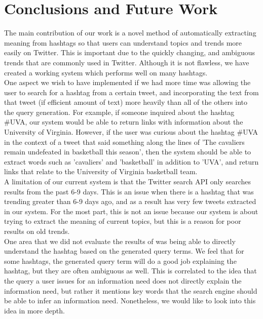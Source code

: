 \documentclass{sig-alternate}
\begin{document}
\section{Conclusions and Future Work}
\label{sec:conclusions}
The main contribution of our work is a novel method of automatically extracting meaning from hashtags so that users can understand topics and trends more easily on Twitter. This is important due to the quickly changing, and ambiguous trends that are commonly used in Twitter. Although it is not flawless, we have created a working system which performs well on many hashtags.\\
One aspect we wish to have implemented if we had more time was allowing the user to search for a hashtag from a certain tweet, and incorporating the text from that tweet (if efficient amount of text) more heavily than all of the others into the query generation. For example, if someone inquired about the hashtag \#UVA, our system would be able to return links with information about the University of Virginia. However, if the user was curious about the hashtag \#UVA in the context of a tweet that said something along the lines of 'The cavaliers remain undefeated in basketball this season', then the system should be able to extract words such as 'cavaliers' and 'basketball' in addition to 'UVA', and return links that relate to the University of Virginia basketball team.\\ 
A limitation of our current system is that the Twitter search API only searches results from the past 6-9 days. This is an issue when there is a hashtag that was trending greater than 6-9 days ago, and as a result has very few tweets extracted in our system. For the most part, this is not an issue because our system is about trying to extract the meaning of current topics, but this is a reason for poor results on old trends. \\
One area that we did not evaluate the results of was being able to directly understand the hashtag based on the generated query terms. We feel that for some hashtags, the generated query term will do a good job explaining the hashtag, but they are often ambiguous as well. This is correlated to the idea that the query a user issues for an information need does not directly explain the information need, but rather it mentions key words that the search engine should be able to infer an information need. Nonetheless, we would like to look into this idea in more depth. 




\end{document}
